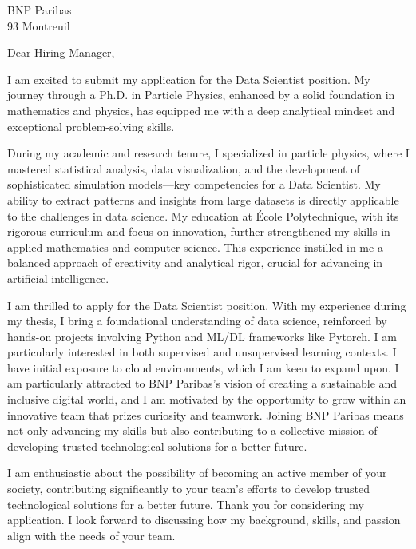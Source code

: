 \documentclass[11pt,a4paper]{lettre}
\begin{document}
\begin{letter} 
{BNP Paribas  \\
93 
Montreuil }
\\
\address{Gaya \textsc{Benane}\\ 171 avenue de Luminy\\ 13~009~Marseille}  

\signature{Gaya \textsc{Benane}}
\nofax
\date{\today}

{}
\opening{\hspace{1em} Dear Hiring Manager,}
\hspace{1em}
I am excited to submit my application for the Data Scientist position. My journey through a Ph.D. in Particle Physics, enhanced by a solid foundation in mathematics and physics, has equipped me with a deep analytical mindset and exceptional problem-solving skills.

During my academic and research tenure, I specialized in particle physics, where I mastered statistical analysis, data visualization, and the development of sophisticated simulation models—key competencies for a Data Scientist. My ability to extract patterns and insights from large datasets is directly applicable to the challenges in data science.
My education at École Polytechnique, with its rigorous curriculum and focus on innovation, further strengthened my skills in applied mathematics and computer science. This experience instilled in me a balanced approach of creativity and analytical rigor, crucial for advancing in artificial intelligence.

I am thrilled to apply for the Data Scientist position. With my experience during my thesis,  
I bring a foundational understanding of data science, reinforced by hands-on projects involving Python and ML/DL frameworks like Pytorch. 
I am particularly interested in both supervised and unsupervised learning contexts. I have initial exposure to cloud environments, which I am keen to expand upon. I am particularly attracted to BNP Paribas's vision of creating a sustainable and inclusive digital world, and I am motivated by the opportunity to grow within an innovative team that prizes curiosity and teamwork. Joining BNP Paribas means not only advancing my skills but also contributing to a collective mission of developing trusted technological solutions for a better future.
\closing{\hspace{1em}
I am enthusiastic about the possibility of becoming an active member of your society, contributing significantly to your team's efforts to develop trusted technological solutions for a better future. Thank you for considering my application. I look forward to discussing how my background, skills, and passion align with the needs of your team.
}
\end{letter}
\end{document}
